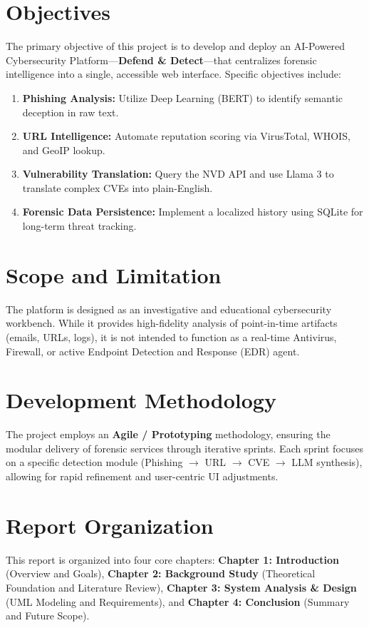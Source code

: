 \documentclass[12pt,a4paper]{report}
\begin{document}
\section{Objectives}
The primary objective of this project is to develop and deploy an AI-Powered Cybersecurity Platform—\textbf{Defend \& Detect}—that centralizes forensic intelligence into a single, accessible web interface.
Specific objectives include:
\begin{enumerate}
    \item \textbf{Phishing Analysis:} Utilize Deep Learning (BERT) to identify semantic deception in raw text.
    \item \textbf{URL Intelligence:} Automate reputation scoring via VirusTotal, WHOIS, and GeoIP lookup.
    \item \textbf{Vulnerability Translation:} Query the NVD API and use Llama 3 to translate complex CVEs into plain-English.
    \item \textbf{Forensic Data Persistence:} Implement a localized history using SQLite for long-term threat tracking.
\end{enumerate}

\section{Scope and Limitation}
The platform is designed as an investigative and educational cybersecurity workbench. While it provides high-fidelity analysis of point-in-time artifacts (emails, URLs, logs), it is not intended to function as a real-time Antivirus, Firewall, or active Endpoint Detection and Response (EDR) agent.

\section{Development Methodology}
The project employs an \textbf{Agile / Prototyping} methodology, ensuring the modular delivery of forensic services through iterative sprints. Each sprint focuses on a specific detection module (Phishing $\rightarrow$ URL $\rightarrow$ CVE $\rightarrow$ LLM synthesis), allowing for rapid refinement and user-centric UI adjustments.

\section{Report Organization}
This report is organized into four core chapters: \textbf{Chapter 1: Introduction} (Overview and Goals), \textbf{Chapter 2: Background Study} (Theoretical Foundation and Literature Review), \textbf{Chapter 3: System Analysis \& Design} (UML Modeling and Requirements), and \textbf{Chapter 4: Conclusion} (Summary and Future Scope).
\end{document}
